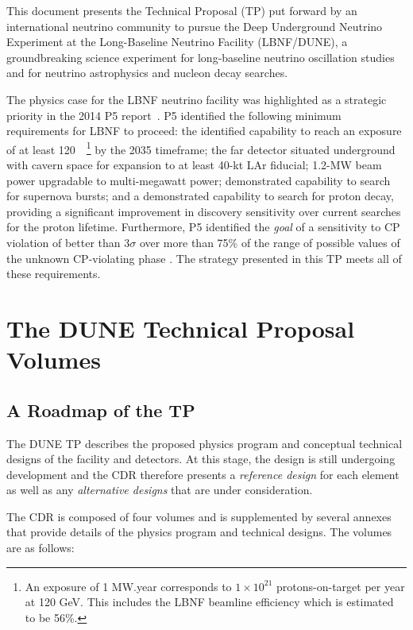 This document presents %
the Technical Proposal (TP) put forward by an international neutrino community to pursue 
the Deep Underground Neutrino Experiment at the Long-Baseline Neutrino Facility (LBNF/DUNE),
a groundbreaking science experiment for long-baseline neutrino oscillation studies and for neutrino astrophysics and nucleon decay searches. 

The physics case for the LBNF neutrino facility was highlighted as a strategic priority in the 2014 P5 report~\cite{p5report2014}.
P5 identified the following minimum requirements for LBNF to proceed: 
the identified capability to reach an exposure of at least 120~\ktMWyr{}~\footnote{An exposure
of 1 MW.year corresponds to $1\times 10^{21}$ protons-on-target per year at 120 GeV. This includes the LBNF beamline efficiency which is estimated to be 56\%.}  by the 2035 timeframe;
the far detector situated underground with cavern space for expansion to at least 40-kt LAr fiducial;
1.2-MW beam power upgradable to multi-megawatt power;
demonstrated capability to search for supernova bursts; and
a demonstrated capability to search for proton decay, 
providing a significant improvement in discovery sensitivity over current searches for the proton lifetime.
Furthermore, P5 identified  the \textit{goal} of a sensitivity to CP violation of better than 3$\sigma$ over more than 75\% 
of the range of possible values of the unknown CP-violating phase \deltacp.
The strategy presented in this TP meets all of these requirements.

\section{The DUNE Technical Proposal Volumes}

\subsection{A Roadmap of the TP}

The DUNE TP describes the proposed physics program and 
conceptual technical designs of the facility and detectors.  At this stage, the design is
still undergoing development and the CDR therefore presents a \textit{reference design} for each element as well as any 
\textit{alternative designs} that are under consideration.

The CDR is composed of four volumes and is supplemented
by several annexes that provide details of the physics program and technical designs. The volumes are as follows:

